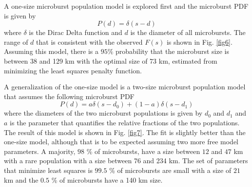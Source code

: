 \documentclass[draft]{agujournal2019}
\begin{document}
A one-size microburst population model is explored first and the microburst PDF is given by 
\begin{equation}
P(d) = \delta(s-d)
\end{equation} where $\delta$ is the Dirac Delta function and $d$ is the diameter of all microbursts. The range of $d$ that is consistent with the observed $F(s)$ is shown in Fig. \ref{fig6}. Assuming this model, there is a $95 \%$ probability that the microburst size is between 38 and 129 km with the optimal size of 73 km, estimated from minimizing the least squares penalty function. 

A generalization of the one-size model is a two-size microburst population model that assumes the following microburst PDF
\begin{equation}
P(d) = a \delta(s-d_0) + (1-a)\delta(s-d_1)
\end{equation} where the diameters of the two microburst populations is given by $d_0$ and $d_1$ and $a$ is the parameter that quantifies the relative fractions of the two populations. The result of this model is shown in Fig. \ref{fig7}. The fit is slightly better than the one-size model, although that is to be expected assuming two more free model parameters. A majority, $98$ \% of microbursts, have a size between $12$ and $47$ km with a rare population with a size between 76 and 234 km. The set of parameters that minimize least squares is $99.5$ \% of microbursts are small with a size of $21$ km and the $0.5$ \% of microbursts have a 140 km size.
\end{document}
